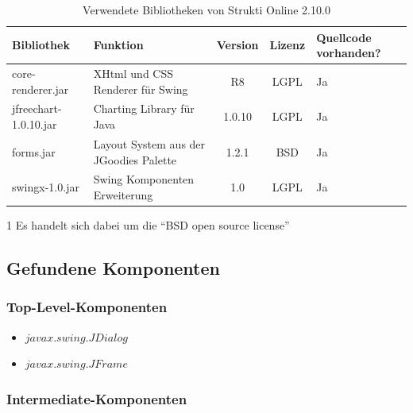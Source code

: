   \begin{table}[ht]
    \sffamily 
    \begin{center}
      \begin{threeparttable}
        \begin{tabular}{lp{4.5cm}ccp{2cm}}
          \toprule
          Bibliothek & Funktion & Version & Lizenz & Quellcode vorhanden?\\
          \midrule
          core-renderer.jar & XHtml und CSS Renderer für Swing & R8 & LGPL &
          Ja\\
          jfreechart-1.0.10.jar & Charting Library für Java & 1.0.10 & LGPL
          & Ja\\
          forms.jar & Layout System aus der JGoodies Palette & 1.2.1 &
          BSD\tnote{1} & Ja\\
          swingx-1.0.jar & Swing Komponenten Erweiterung & 1.0 & LGPL & Ja\\
          \bottomrule
        \end{tabular}
        \caption{Verwendete Bibliotheken von Strukti Online 2.10.0}
        \label{tab:bibliothekenStruktiOnline}
        \begin{tablenotes}[++]\footnotesize 
          \item[1] Es handelt sich dabei um die ``BSD open source license''
        \end{tablenotes} 
      \end{threeparttable}
    \end{center}
  \end{table}
  
  \subsection{Gefundene Komponenten}
  
  \subsubsection{Top-Level-Komponenten}
  
  \begin{itemize}
    \item \(javax.swing.JDialog\)
    \item \(javax.swing.JFrame\)
  \end{itemize}
  
  \subsubsection{Intermediate-Komponenten}
  
